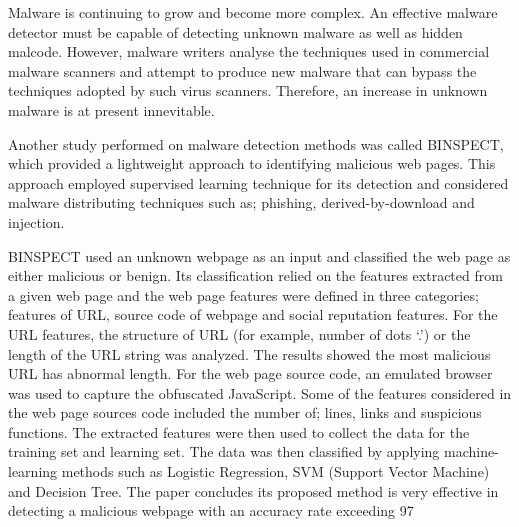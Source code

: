 Malware is continuing to grow and become more complex. An effective malware detector must be capable of detecting unknown malware as well as hidden malcode. However, malware writers analyse the techniques used in commercial malware scanners and attempt to produce new malware that can bypass the techniques adopted by such virus scanners. Therefore, an increase in unknown malware is at present innevitable.\cite{vinod2009survey}


Another study performed on malware detection methods was called BINSPECT, which provided a lightweight approach to identifying malicious web pages. This approach employed supervised learning technique for its detection and considered malware distributing techniques such as; phishing, derived-by-download and injection.\cite{eshete2012binspect}

BINSPECT used an unknown webpage as an input and classified the web page as either malicious or benign. Its classification relied on the features extracted from a given web page and the web page features were defined in three categories; features of URL, source code of webpage and social reputation features. 
For the URL features, the structure of URL (for example, number of dots ‘.’) or the length of the URL string was analyzed. The results showed the most malicious URL has abnormal length. For the web page source code, an emulated browser was used to capture the obfuscated JavaScript. Some of the features considered in the web page sources code included the number of; lines, links and suspicious functions. The extracted features were then used to collect the data for the training set and learning set. The data was then classified by applying machine-learning methods such as Logistic Regression, SVM (Support Vector Machine) and Decision Tree.\cite{eshete2012binspect}
The paper concludes its proposed method is very effective in detecting a malicious webpage with an accuracy rate exceeding 97%
